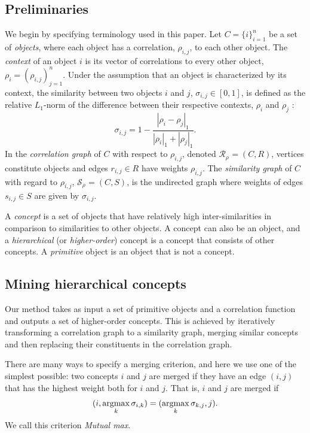 \documentclass[conference]{IEEEtran}
\newcommand{\rn}[1]{\rho_{#1}}
\newcommand{\rns}[1]{|\rn{#1}|_1}
\newcommand{\sy}[1]{\sigma_{#1}}
\newcommand{\dnm}[2]{|\rn{#1}-\rn{#2}|_1}
\newcommand{\argmax}{\operatornamewithlimits{argmax}}
\begin{document}
\subsection{Preliminaries}
\label{sec:preliminaries}
We begin by specifying terminology used in this paper.
Let $C = \{i\}_{i=1}^n$ be a set of \emph{objects}, where each object has a correlation, $\rn{i,j}$, 
to each other object. The \emph{context} of an object $i$ is its 
vector of correlations to every other object, $\rn{i} = (\rn{i,j})_{j=1}^n$. Under the assumption that an object is 
characterized by its context, the similarity between two objects $i$ and 
$j$, $\sy{i,j}  \in [0, 1]$, is defined as the relative $L_1$-norm of the difference between their respective contexts, $\rn{i}$ and $\rn{j}$
\cite{Gornerup15}:
\begin{equation}\label{eq:sim}
\sy{i,j} = 1 - \frac{\dnm{i}{j}}{\rns{i} + \rns{j}}.
\end{equation}
In the \emph{correlation graph} of $C$ with respect to $\rn{i,j}$, denoted $\mathcal{R}_{\rn{}} = (C, R)$, 
vertices constitute objects and  edges $r_{i,j} \in R$ have weights $\rn{i,j}$. The \emph{similarity graph} of $C$ with 
regard to $\rn{i,j}$, $\mathcal{S}_{\rn{}} = (C, S)$, is the undirected graph where weights of edges $s_{i,j} \in S$ are 
given by $\sy{i,j}$. 

A \emph{concept} is a set of objects that have relatively high inter-similarities
in comparison to similarities to other objects. A concept can also be an object, 
and a \emph{hierarchical} (or \emph{higher-order}) concept is a concept that consists of other concepts.
A \emph{primitive} object is an object that is not a concept.

\subsection{Mining hierarchical concepts}
\label{subsec:conceptmining}

Our method takes as input a set of primitive objects and a correlation function and outputs a set of 
higher-order concepts. This is achieved by iteratively transforming a correlation graph to a similarity graph, 
merging similar concepts and then replacing their constituents in the correlation graph. 

There are many ways to specify a merging criterion, and here we use one of the simplest possible: two concepts $i$ and $j$
are merged if they have an edge $(i, j)$ that has the highest weight both for $i$ and $j$. That is, $i$ and $j$ are merged if
\begin{equation}\label{eq:mergecriterion}
(i, \argmax_k \sy{i,k}) = (\argmax_k \sy{k, j}, j).
\end{equation}
We call this criterion \emph{Mutual max}. 
\end{document}
